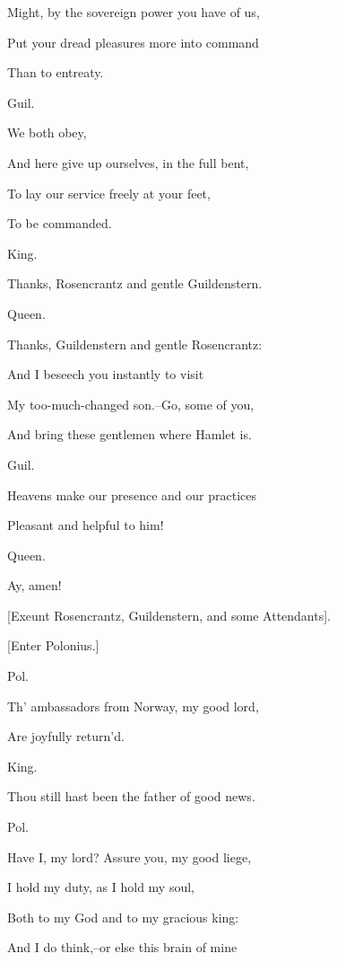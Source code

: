 \documentclass[12pt]{book}
\begin{document}
Might, by the sovereign power you have of us,

Put your dread pleasures more into command

Than to entreaty.



Guil.

We both obey,

And here give up ourselves, in the full bent,

To lay our service freely at your feet,

To be commanded.



King.

Thanks, Rosencrantz and gentle Guildenstern.



Queen.

Thanks, Guildenstern and gentle Rosencrantz:

And I beseech you instantly to visit

My too-much-changed son.--Go, some of you,

And bring these gentlemen where Hamlet is.



Guil.

Heavens make our presence and our practices

Pleasant and helpful to him!



Queen.

Ay, amen!



[Exeunt Rosencrantz, Guildenstern, and some Attendants].



[Enter Polonius.]



Pol.

Th' ambassadors from Norway, my good lord,

Are joyfully return'd.



King.

Thou still hast been the father of good news.



Pol.

Have I, my lord? Assure you, my good liege,

I hold my duty, as I hold my soul,

Both to my God and to my gracious king:

And I do think,--or else this brain of mine
\end{document}
